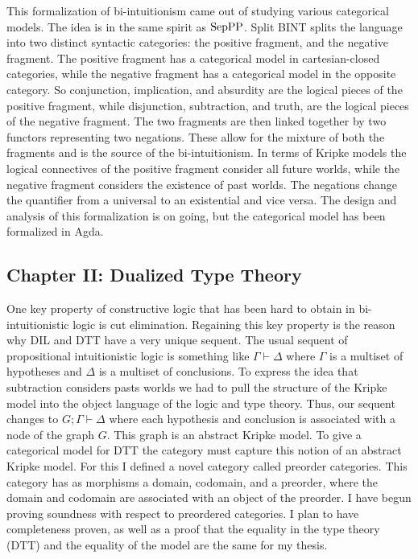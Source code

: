 This formalization of bi-intuitionism came out of studying various
categorical models.  The idea is in the same spirit as $\text{SepPP}$. Split
BINT splits the language into two distinct syntactic categories: the
positive fragment, and the negative fragment. The positive fragment
has a categorical model in cartesian-closed categories, while the
negative fragment has a categorical model in the opposite category.
So conjunction, implication, and absurdity are the logical pieces of
the positive fragment, while disjunction, subtraction, and truth, are
the logical pieces of the negative fragment.  The two fragments are
then linked together by two functors representing two negations.
These allow for the mixture of both the fragments and is the source of
the bi-intuitionism.  In terms of Kripke models the logical
connectives of the positive fragment consider all future worlds, while
the negative fragment considers the existence of past worlds.  The
negations change the quantifier from a universal to an existential and
vice versa.  The design and analysis of this formalization is on
going, but the categorical model has been formalized in Agda.

\subsection{Chapter II: Dualized Type Theory}
\label{subsubsec:dualized_type_theory}
One key property of constructive logic that has been hard to obtain in
bi-intuitionistic logic is cut elimination.  Regaining this key
property is the reason why DIL and DTT have a very unique sequent.
The usual sequent of propositional intuitionistic logic is something
like $\Gamma \vdash \Delta$ where $\Gamma$ is a multiset of hypotheses
and $\Delta$ is a multiset of conclusions.  To express the idea that
subtraction considers pasts worlds we had to pull the structure of the
Kripke model into the object language of the logic and type theory.
Thus, our sequent changes to $G ; \Gamma \vdash \Delta$ where each
hypothesis and conclusion is associated with a node of the graph $G$.
This graph is an abstract Kripke model.  To give a categorical model
for DTT the category must capture this notion of an abstract Kripke
model.  For this I defined a novel category called preorder
categories.  This category has as morphisms a domain, codomain, and a
preorder, where the domain and codomain are associated with an object
of the preorder.  I have begun proving soundness with respect to
preordered categories.  I plan to have completeness proven, as well as
a proof that the equality in the type theory (DTT) and the equality of
the model are the same for my thesis.

